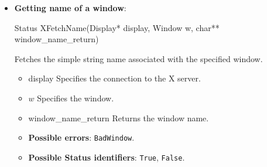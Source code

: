 \documentclass{report}
\begin{document}
\begin{itemize}
\begin{itemize}
                    \item \textbf{Status identifiers}:
                        \begin{itemize}
                            \item \textbf{0}: Failure.
                            \item \textbf{Nonzero}: Success.
                        \end{itemize}
                \end{itemize}
            \item \textbf{Getting name of a window}:
                \bigbreak \noindent 
                \begin{cppcode}
                    Status XFetchName(Display* display, Window w, char** window_name_return)
                \end{cppcode}
                \bigbreak \noindent
                Fetches the simple string name associated with the specified window.
                \begin{itemize}
                    \item display Specifies the connection to the X server.
                    \item $w$ Specifies the window.
                    \item window\_name\_return Returns the window name.
                \end{itemize}
                \begin{itemize}
                    \item \textbf{Possible errors}: \texttt{BadWindow}.
                    \item \textbf{Possible Status identifiers}: \texttt{True}, \texttt{False}.
                \end{itemize}

    \end{itemize}

    \pagebreak 
\end{document}
